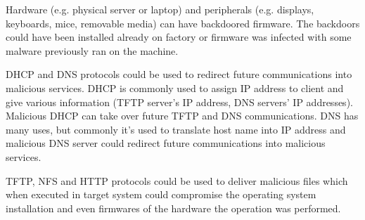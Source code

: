 Hardware (e.g. physical server or laptop) and peripherals
(e.g. displays, keyboards, mice, removable media) can have backdoored
firmware. The backdoors could have been installed already on factory
or firmware was infected with some malware previously ran on the
machine.

DHCP and DNS protocols could be used to redirect future communications
into malicious services. DHCP is commonly used to assign IP address to
client and give various information (TFTP server's IP address, DNS
servers' IP addresses). Malicious DHCP can take over future TFTP and
DNS communications. DNS has many uses, but commonly it's used to
translate host name into IP address and malicious DNS server could
redirect future communications into malicious services.

TFTP, NFS and HTTP protocols could be used to deliver malicious files
which when executed in target system could compromise the operating
system installation and even firmwares of the hardware the operation
was performed.
